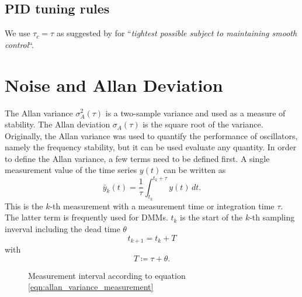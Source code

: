 



\clearpage
\subsection{PID tuning rules}
\label{sec:pid_tuning_rules}

We use $\tau_c = \tau$ as suggested by \cite{simc,smic2} for “\textit{tightest possible subject to maintaining smooth control}“.

\clearpage
\section{Noise and Allan Deviation}
\label{sec:allan_deviation}
The Allan variance \cite{adev} $\sigma_A^2(\tau)$ is a two-sample variance and used as a measure of stability. The Allan deviation $\sigma_A(\tau)$ is the square root of the variance. Originally, the Allan variance was used to quantify the performance of oscillators, namely the frequency stability, but it can be used evaluate any quantity. In order to define the Allan variance, a few terms need to be defined first. A single measurement value of the time series $y(t)$ can be written as
\begin{equation}
    \bar y_k(t) = \frac{1}{\tau} \int_{t_{k}}^{t_{k}+\tau} y(t)\,dt . \label{eqn:allan_variance_measurement}
\end{equation}
This is the $k$-th measurement with a measurement time or integration time $\tau$. The latter term is frequently used for DMMs. $t_k$ is the start of the $k$-th sampling inverval including the dead time $\theta$
\begin{equation}
    t_{k+1} = t_k + T
\end{equation}
with
\begin{equation}
    T \coloneqq \tau + \theta .
\end{equation}

\begin{figure}[hb]
    \centering
    \caption{Measurement interval according to equation \ref{eqn:allan_variance_measurement}}
    \label{fig:allan_variance_definitions}
\end{figure}

